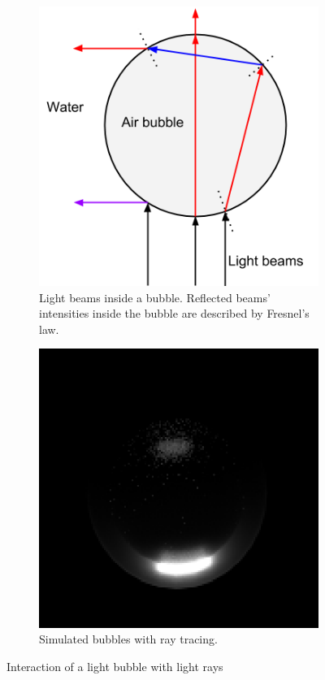 			\begin{figure}
		    \centering
		    \begin{subfigure}[t]{0.5\textwidth}
		    		\centering
		        \includegraphics[scale=.5]{images/bubble_refraction.png}
		        \caption{Light beams inside a bubble. Reflected beams' intensities inside the bubble are described by Fresnel's law.}
		        \label{subfig:bubble_refraction}
		    \end{subfigure}%
		    \begin{subfigure}[t]{0.5\textwidth}
		    		\centering
		        \includegraphics[scale=0.6]{images/bubble_simulation.png}
		        \caption{Simulated bubbles with ray tracing.}	
		        \label{subfig:bubble_simulation}
		    \end{subfigure}
		    
		    \caption{Interaction of a light bubble with light rays}
		    \label{fig:bubble_physics}
	 		\end{figure}	
			
